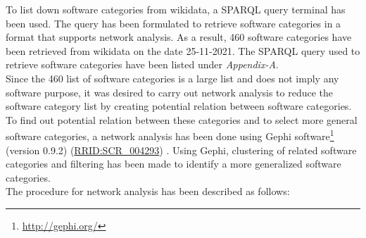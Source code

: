 To list down software categories from wikidata, a \ac{SPARQL} query terminal has been used. The query has been formulated to retrieve software categories in a format that supports network analysis. As a result, 460 software categories have been retrieved from wikidata on the date 25-11-2021. The \ac{SPARQL} query used to retrieve software categories have been listed under \emph{Appendix-A}.\\

Since the 460 list of software categories is a large list and does not imply any software purpose, it was desired to carry out network analysis to reduce the software category list by creating potential relation between software categories. To find out potential relation between these categories and to select more general software categories, a network analysis has been done using Gephi software\footnote{\url{http://gephi.org/}} (version 0.9.2) (\href{https://scicrunch.org/resolver/SCR_004293}{RRID:SCR\_004293}) . Using Gephi, clustering of related software categories and filtering has been made to identify a more generalized software categories. \\

\noindent The procedure for network analysis has been described as follows:

